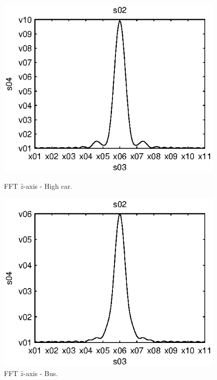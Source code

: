 \begin{subfigures}
\begin{figure}[thb]
\begin{minipage}{0.45\linewidth}
 	\centering
 	
	\includegraphics[width=1\linewidth]{images/fft-high_car-z}
  	\caption[FFT $\hat{z}$-axis - High car]{FFT $\hat{z}$-axis - High car.}
  	\label{fig:fft-high_car-z}
 \end{minipage} \hfill
 \begin{minipage}{0.45\linewidth}
 \centering
 	
	\includegraphics[width=1\linewidth]{images/fft-bus-z}
  	\caption[FFT $\hat{z}$-axis - Bus]{FFT $\hat{z}$-axis - Bus.}
  	\label{fig:fft-bus-z}
 \end{minipage}
\end{figure}
\end{subfigures}